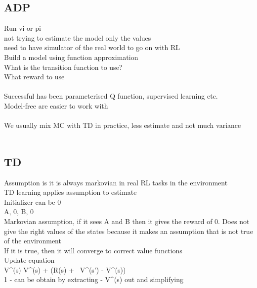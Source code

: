 \documentclass[11pt]{article}
\begin{document}
\subsection*{ADP}
Run vi or pi\\
not trying to estimate the model only the values
\\
need to have simulator of the real world to go on with RL
\\
Build a model using function approximation\\
What is the transition function to use?\\
What reward to use\\
\\
Successful has been parameterised Q function, supervised learning etc.
\\
Model-free are easier to work with\\
\\
We usually mix MC with TD in practice, less estimate and not much variance\\
\\
\subsection*{TD}
Assumption is it is always markovian in real RL tasks in the environment\\
TD learning applies assumption to estimate\\
Initializer can be 0\\
A, 0, B, 0\\
Markovian assumption, if it sees A and B then it gives the reward of 0.
Does not give the right values of the states because it makes an assumption that is not true of the environment\\
If it is true, then it will converge to  correct value functions\\
Update equation\\
 V^{\pi}(s) \leftarrow V^{\pi}(s) + \alpha(R(s) + \gamma\ V^{\pi}(s') - V^{\pi}(s))
 \\
 1 - \alpha can be obtain by extracting - V^{\pi}(s) out and simplifying
\end{document}
